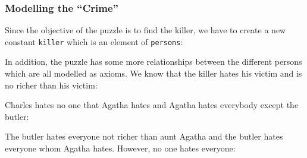 \subsubsection{Modelling the ``Crime''}

Since the objective of the puzzle is to find the killer, we have to create a new constant \texttt{killer} which is an element of \texttt{persons}:


In addition, the puzzle has some more relationships between the different persons which are all modelled as axioms. We know that the killer hates his victim and is no richer than his victim:


Charles hates no one that Agatha hates and Agatha hates everybody except the butler:


The butler hates everyone not richer than aunt Agatha and the butler hates everyone whom Agatha hates. However, no one hates everyone:



